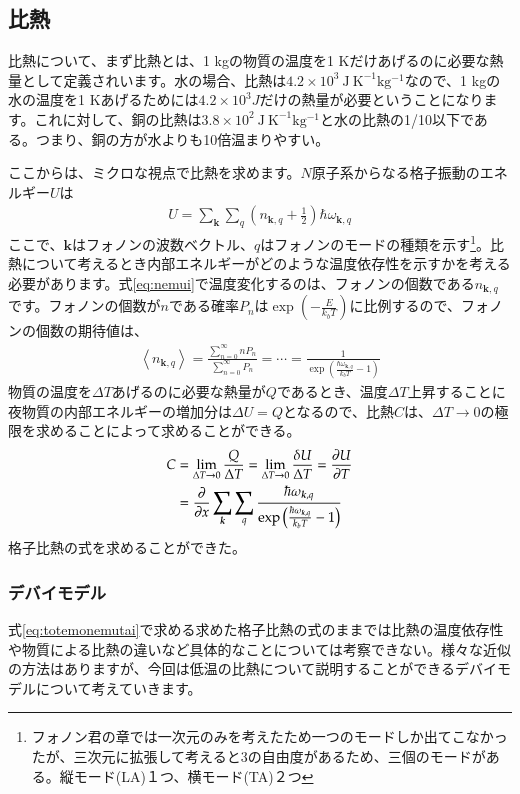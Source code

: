 \documentclass[10pt,b5paper,papersize,dvipdfmx]{jsbook}
\begin{document}
\subsection{比熱}
比熱について、まず比熱とは、1 kgの物質の温度を1 Kだけあげるのに必要な熱量として定義されいます。水の場合、比熱は$4.2 \times 10^3\  \mathrm{J\ K ^{-1} kg^{-1}}$なので、1 kgの水の温度を1 Kあげるためには$4.2 \times 10^3 J$だけの熱量が必要ということになります。これに対して、銅の比熱は$3.8 \times 10^2\ \mathrm{J\ K ^{-1} kg^{-1}}$と水の比熱の1/10以下である。つまり、銅の方が水よりも10倍温まりやすい。\par
ここからは、ミクロな視点で比熱を求めます。$N$原子系からなる格子振動のエネルギー$U$は
\begin{align}
  U = \sum_{\bm{k}}\sum_{q}\left(n_{\bm{k},q} + \frac{1}{2}\right)\hbar \omega_{\bm{k},q}
  \label{eq:nemui}
\end{align}
ここで、$\bm{k}$はフォノンの波数ベクトル、$q$はフォノンのモードの種類を示す\footnote{フォノン君の章では一次元のみを考えたため一つのモードしか出てこなかったが、三次元に拡張して考えると3の自由度があるため、三個のモードがある。縦モード(LA)１つ、横モード(TA)２つ}。比熱について考えるとき内部エネルギーがどのような温度依存性を示すかを考える必要があります。式\ref{eq:nemui}で温度変化するのは、フォノンの個数である$n_{\bm{k},q}$です。フォノンの個数が$n$である確率$P_n$は$\exp\left(-\frac{E}{k_bT}\right)$に比例するので、フォノンの個数の期待値は、
\begin{align}
  \left\langle n_{\bm{k},q}\right\rangle = \frac{\sum_{n = 0}^\infty nP_n}{\sum_{n = 0}^\infty P_n} = \cdots = \frac{1}{\exp \left(\frac{\hbar \omega_{\bm{k}, q}}{k_bT}-1\right)}
\end{align}
物質の温度を$\Delta T$あげるのに必要な熱量が$Q$であるとき、温度$\Delta T$上昇することに夜物質の内部エネルギーの増加分は$\Delta U = Q$となるので、比熱$C$は、$\Delta T \rightarrow 0$の極限を求めることによって求めることができる。
\begin{align}
  C &= \lim_{\Delta T \rightarrow 0} \frac{Q}{\Delta T} = \lim_{\Delta T \rightarrow 0} \frac{\delta U}{\Delta T} = \pdv{U}{T}\\
    &= \pdv{x} \sum_{\bm{k}}\sum_{q}\frac{\hbar \omega_{\bm{k},q}}{\exp\left(\frac{\hbar \omega_{\bm{k},q}}{k_bT}-1\right)}
\label{eq:totemonemutai}
\end{align}
格子比熱の式を求めることができた。
\subsubsection*{デバイモデル}
式\ref{eq:totemonemutai}で求める求めた格子比熱の式のままでは比熱の温度依存性や物質による比熱の違いなど具体的なことについては考察できない。様々な近似の方法はありますが、今回は低温の比熱について説明することができるデバイモデルについて考えていきます。\par
\end{document}
